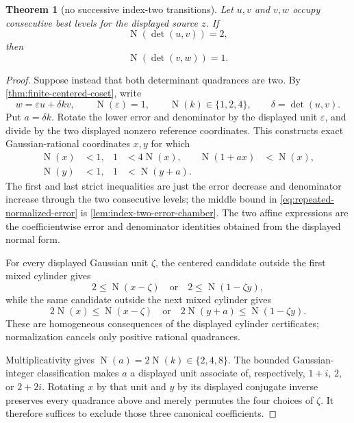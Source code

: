 \documentclass[11pt]{article}
\newtheorem{theorem}{Theorem}[section]
\newcommand{\Norm}[1]{\operatorname{N}\!\left(#1\right)}
\begin{document}
\begin{theorem}[no successive index-two transitions]
\label{thm:no-successive-index-two}
Let $u,v$ and $v,w$ occupy consecutive best levels for the displayed source
$z$.  If
\[
                       \Norm{\det(u,v)}=2,
\]
then
\[
                       \Norm{\det(v,w)}=1.
\]
\end{theorem}

\begin{proof}
Suppose instead that both determinant quadrances are two.  By
\cref{thm:finite-centered-coset}, write
\[
        w=\varepsilon u+\delta k v,
        \qquad \Norm\varepsilon=1,
        \qquad \Norm k\in\{1,2,4\},
        \qquad \delta=\det(u,v).
\]
Put $a=\delta k$.  Rotate the lower error and denominator by the displayed
unit $\varepsilon$, and divide by the two displayed nonzero reference
coordinates.  This constructs exact Gaussian-rational coordinates $x,y$
for which
\begin{align}
 \Norm x&<1,& 1&<4\Norm x,&
 \Norm{1+ax}&<\Norm x,\label{eq:repeated-normalized-error}\\
 \Norm y&<1,& 1&<\Norm{y+a}.\label{eq:repeated-normalized-denominator}
\end{align}
The first and last strict inequalities are just the error decrease and
denominator increase through the two consecutive levels; the middle bound in
\eqref{eq:repeated-normalized-error} is
\cref{lem:index-two-error-chamber}.  The two affine expressions are the
coefficientwise error and denominator identities obtained from the displayed
normal form.

For every displayed Gaussian unit $\zeta$, the centered candidate outside
the first mixed cylinder gives
\begin{equation}
  2\le\Norm{x-\zeta}
  \quad\text{or}\quad
  2\le\Norm{1-\zeta y},
  \label{eq:repeated-self-obstruction}
\end{equation}
while the same candidate outside the next mixed cylinder gives
\begin{equation}
  2\Norm x\le\Norm{x-\zeta}
  \quad\text{or}\quad
  2\Norm{y+a}\le\Norm{1-\zeta y}.
  \label{eq:repeated-next-obstruction}
\end{equation}
These are homogeneous consequences of the displayed cylinder certificates;
normalization cancels only positive rational quadrances.

Multiplicativity gives
$\Norm a=2\Norm k\in\{2,4,8\}$.  The bounded Gaussian-integer
classification makes $a$ a displayed unit associate of, respectively,
$1+i$, $2$, or $2+2i$.  Rotating $x$ by that unit and $y$ by its displayed
conjugate inverse preserves every quadrance above and merely permutes the
four choices of $\zeta$.  It therefore suffices to exclude those three
canonical coefficients.


\end{proof}
\end{document}

